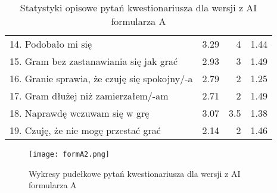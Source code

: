 \begin{table}[h!]
\begin{center}
\begin{tabular}{|m{10em}|r|r|r|}
            14. Podobało mi się                                               & 3.29          & 4       & 1.44           \\
            15. Gram bez zastanawiania się jak grać                           & 2.93          & 3       & 1.49           \\
            16. Granie sprawia, \newline że czuję się spokojny/-a             & 2.79          & 2       & 1.25           \\
            17. Gram dłużej \newline niż zamierzałem/-am                      & 2.71          & 2       & 1.49           \\
            18. Naprawdę wczuwam się w grę                                    & 3.07          & 3.5     & 1.38           \\
            19. Czuję, że nie mogę przestać grać                              & 2.14          & 2       & 1.46           \\
            \hline
        \end{tabular}
    \end{center}
    \caption{Statystyki opisowe pytań kwestionariusza dla wersji z AI formularza A}\label{tab1:ch7_8}
\end{table}

\begin{figure}[h!]
    \centering
    \texttt{[image: formA2.png]}
    \caption{Wykresy pudełkowe pytań kwestionariusza dla wersji z AI formularza A}
    \label{fig:ch7_formA2}
\end{figure}

